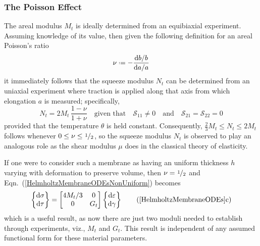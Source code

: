 \subsubsection{The Poisson Effect}
\label{PoissonRatio}

The areal modulus $M_t$ is ideally determined from an equibiaxial experiment.  Assuming knowledge of its value, then given the following definition for an areal Poisson's ratio
\begin{displaymath}
\nu \defeq - \frac{\mathrm{d}b / b}{\mathrm{d}a / a}
\end{displaymath}
it immediately follows that the squeeze modulus $N_t$ can be determined from an uniaxial experiment where traction is applied along that axis from which elongation $a$ is measured; specifically,
\begin{displaymath}
N_t = 2M_t \, \frac{1 - \nu}{1 + \nu} 
\quad \text{given that} \quad
\mathcal{S}_{11} \neq 0 
\quad \text{and} \quad
\mathcal{S}_{21} = \mathcal{S}_{22} = 0 
\end{displaymath}
provided that the temperature $\theta$ is held constant.  Consequently, $\tfrac{2}{3} M_t \leq N_t \leq 2M_t$ follows whenever $0 \leq \nu \leq \textfrac{1}{2}$, so the squeeze modulus $N_t$ is observed to play an analogous role as the shear modulus $\mu$ does in the classical theory of elasticity.  

If one were to consider such a membrane as having an uniform thickness $h$ varying with deformation to preserve volume, then $\nu = \textfrac{1}{2}$ and Eqn.~(\ref{HelmholtzMembraneODEsNonUniform}) becomes
\begin{equation}
\left\{ \begin{matrix}
\mathrm{d} \sigma \\ \mathrm{d} \tau
\end{matrix} \right\} = \begin{bmatrix}
4 M_t / 3 & 0 \\
0 & G_t
\end{bmatrix} \left\{ \begin{matrix}
\mathrm{d} \varepsilon \\ \mathrm{d} \gamma
\end{matrix} \right\}
\label{HelmholtzMembraneODEsNonUniformCV}
    \tag{\ref{HelmholtzMembraneODEs}c}
\end{equation}
which is a useful result, as now there are just two moduli needed to establish through experiments, viz., $M_t$ and $G_t$.  This result is independent of any assumed functional form for these material parameters.

